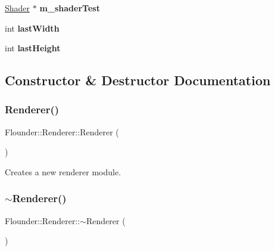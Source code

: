 \begin{DoxyCompactItemize}
\item 
\mbox{\label{class_flounder_1_1_renderer_a81fb5c786c4c61342fc82485b3cbbae0}} 
\hyperlink{class_flounder_1_1_shader}{Shader} $\ast$ {\bfseries m\+\_\+shader\+Test}
\item 
\mbox{\label{class_flounder_1_1_renderer_abc0fbbc7910d0a4f21a08ae20ecda967}} 
int {\bfseries last\+Width}
\item 
\mbox{\label{class_flounder_1_1_renderer_abdf48067b5a90523ce70e0b09c453eeb}} 
int {\bfseries last\+Height}
\end{DoxyCompactItemize}


\subsection{Constructor \& Destructor Documentation}
\mbox{\label{class_flounder_1_1_renderer_a4c9a104c25dc5f5f5a72c9feccc8994f}} 
\subsubsection{\texorpdfstring{Renderer()}{Renderer()}}
{\footnotesize\ttfamily Flounder\+::\+Renderer\+::\+Renderer (\begin{DoxyParamCaption}{ }\end{DoxyParamCaption})}



Creates a new renderer module. 

\mbox{\label{class_flounder_1_1_renderer_ace813f1495d22bb4072de8adadf523f9}} 
\subsubsection{\texorpdfstring{$\sim$\+Renderer()}{~Renderer()}}
{\footnotesize\ttfamily Flounder\+::\+Renderer\+::$\sim$\+Renderer (\begin{DoxyParamCaption}{ }\end{DoxyParamCaption})}



